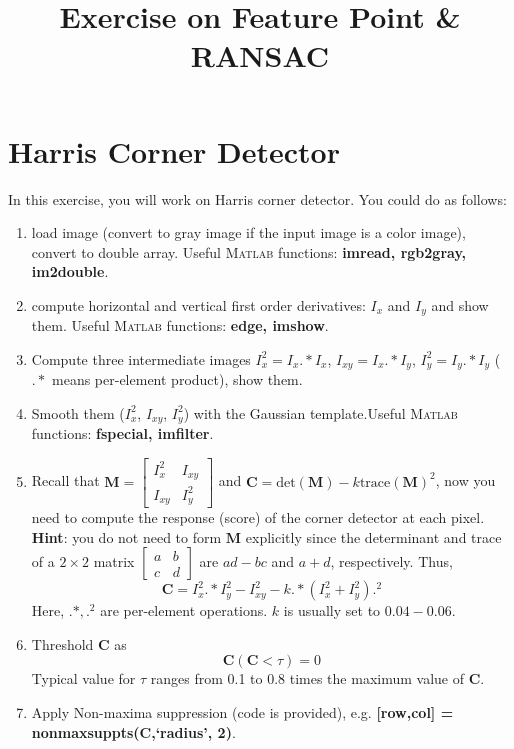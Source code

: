 \documentclass[a4paper]{article}
\begin{document}
\title{Exercise on Feature Point \& RANSAC}
\maketitle%

\section{Harris Corner Detector}

In this exercise, you will work on Harris corner detector. You could do as follows:
\begin{enumerate}
\item load image (convert to gray image if the input image is a color image), convert to double array. Useful \textsc{Matlab} functions: \textbf{imread, rgb2gray, im2double}. 
\item compute horizontal and vertical first order derivatives: $I_x$ and $I_y$ and show them. Useful \textsc{Matlab} functions: \textbf{edge, imshow}. 
\item Compute three intermediate images $I_x^2=I_x.*I_x$, $I_{xy}=I_x.*I_y$, $I_y^2=I_y.*I_y$ ($.*$ means per-element product), show them.
\item Smooth them ($I_x^2$, $I_{xy}$, $I_y^2$) with the Gaussian template.Useful \textsc{Matlab} functions: \textbf{fspecial, imfilter}.  
\item Recall that $\mathbf{M}=\left[\begin{matrix}
I_x^2 & I_{xy} \\ I_{xy} & I_y^2
\end{matrix}\right]$ and $\mathbf{C}=\text{det}(\mathbf{M})-k\text{trace}(\mathbf{M})^2$, now you need to compute the response (score) of the corner detector at each pixel. \textbf{Hint}: you do not need to form $\mathbf{M}$ explicitly since the determinant and trace of a $2\times 2$ matrix 
$\left[\begin{matrix}
a & b \\ c & d 
\end{matrix}\right]$ are $ad-bc$ and $a+d$, respectively. Thus, $$\mathbf{C}=I_x^2.*I_y^2-I_{xy}^2-k.*(I_x^2+I_y^2).^2$$
Here, $.*, .^2$ are per-element operations. $k$ is usually set to $0.04-0.06$.
\item Threshold $\mathbf{C}$ as
$$
\mathbf{C}(\mathbf{C}<\tau)=0
$$
Typical value for $\tau$ ranges from 0.1 to 0.8 times the maximum value of $\mathbf{C}$.
\item Apply Non-maxima suppression (code is provided), e.g. \textbf{[row,col] = nonmaxsuppts(C,`radius', 2)}.
\end{enumerate}
\end{document}
